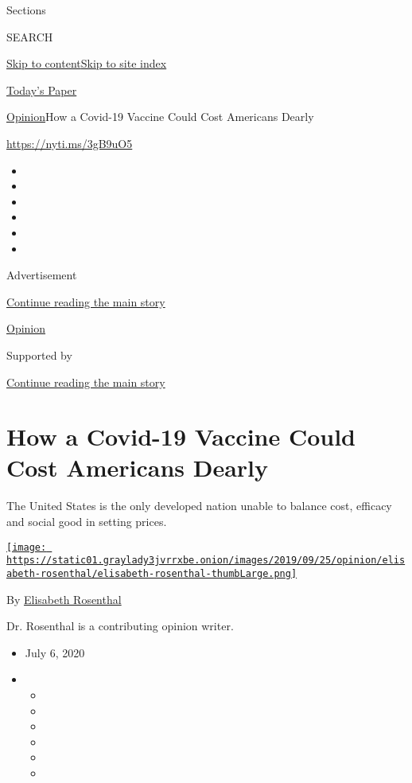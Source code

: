 Sections

SEARCH

\protect\hyperlink{site-content}{Skip to
content}\protect\hyperlink{site-index}{Skip to site index}

\href{https://myaccount.nytimes3xbfgragh.onion/auth/login?response_type=cookie\&client_id=vi}{}

\href{https://www.nytimes3xbfgragh.onion/section/todayspaper}{Today's
Paper}

\href{/section/opinion}{Opinion}\textbar{}How a Covid-19 Vaccine Could
Cost Americans Dearly

\url{https://nyti.ms/3gB9uO5}

\begin{itemize}
\item
\item
\item
\item
\item
\item
\end{itemize}

Advertisement

\protect\hyperlink{after-top}{Continue reading the main story}

\href{/section/opinion}{Opinion}

Supported by

\protect\hyperlink{after-sponsor}{Continue reading the main story}

\hypertarget{how-a-covid-19-vaccine-could-cost-americans-dearly}{%
\section{How a Covid-19 Vaccine Could Cost Americans
Dearly}\label{how-a-covid-19-vaccine-could-cost-americans-dearly}}

The United States is the only developed nation unable to balance cost,
efficacy and social good in setting prices.

\href{https://www.nytimes3xbfgragh.onion/by/elisabeth-rosenthal}{\texttt{[image: https://static01.graylady3jvrrxbe.onion/images/2019/09/25/opinion/elisabeth-rosenthal/elisabeth-rosenthal-thumbLarge.png]}}

By
\href{https://www.nytimes3xbfgragh.onion/by/elisabeth-rosenthal}{Elisabeth
Rosenthal}

Dr. Rosenthal is a contributing opinion writer.

\begin{itemize}
\item
  July 6, 2020
\item
  \begin{itemize}
  \item
  \item
  \item
  \item
  \item
  \item
  \end{itemize}
\end{itemize}

